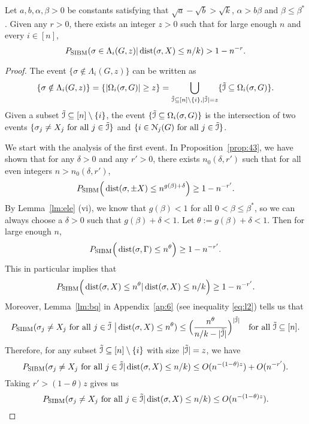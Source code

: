 \documentclass{article}
\begin{document}
\begin{lemma} \label{lm:us}
	Let $a,b,\alpha,\beta> 0$ be constants satisfying that $\sqrt{a}-\sqrt{b} > \sqrt{k}$, $\alpha>b\beta$ and $\beta\le \beta^\ast$.
	Given any $r>0$, there exists an integer $z>0$ such that for large enough $n$ and every $i\in[n]$, 
	\begin{equation} \label{eq:zr}
	P_{\operatorname{SIBM}} (\sigma\in \Lambda_i(G, z)
	| \operatorname{dist}(\sigma, X) \le n/k)
	> 1 - n^{-r} .
	\end{equation}
\end{lemma}
\begin{proof}
	The event $\{\sigma\notin \Lambda_i(G, z) \}$ can be written as
	\begin{equation} \label{eq:lei}
	\{\sigma\notin \Lambda_i(G, z) \}
	=\{|\Omega_i(\sigma,G)| \ge z \}
	=\bigcup_{\tilde{\mathcal{I}}\subseteq[n]\setminus\{i\}, |\tilde{\mathcal{I}}| = z} \{\tilde{\mathcal{I}} \subseteq \Omega_i(\sigma,G)\} .
	\end{equation}
	Given a subset $\tilde{\mathcal{I}}\subseteq[n]\setminus\{i\}$,
	the event $\{\tilde{\mathcal{I}} \subseteq \Omega_i(\sigma,G) \}$ is the intersection of two events $\{\sigma_j \neq X_j \text{~for all~} j\in \tilde{\mathcal{I}}\}$ and $\{i\in\mathcal{N}_j(G) \text{~for all~} j\in \tilde{\mathcal{I}}\}$.
	
	We start with the analysis of the first event.
	In Proposition~\ref{prop:43}, we have shown that
	for any $\delta>0$ and any $r'>0$, there exists $n_0(\delta, r')$ such that for all even integers $n>n_0(\delta, r')$,
	$$ 
	P_{\operatorname{SIBM}} \Big(\operatorname{dist}(\sigma,\pm X) \le n^{g(\beta)+\delta}
	\Big) \ge 1- n^{-r'} .
	$$
	By Lemma~\ref{lm:ele} (vi), we know that $g(\beta)<1$ for all $0<\beta\le\beta^\ast$, so we can always choose a $\delta>0$ such that $g(\beta)+\delta<1$.
	Let $\theta:=g(\beta)+\delta<1$. Then for large enough $n$,
	$$
	P_{\operatorname{SIBM}} \Big(\operatorname{dist}(\sigma, \Gamma) \le n^{\theta} \Big) \ge 1- n^{-r'} .
	$$
	This in particular implies that
	$$
	P_{\operatorname{SIBM}} \Big(\operatorname{dist}(\sigma, X) \le n^{\theta} | \operatorname{dist}(\sigma, X) \le n/k
	\Big) \ge 1- n^{-r'} .
	$$
	Moreover, Lemma~\ref{lm:bq} in Appendix~\ref{ap:6} (see inequality \eqref{eq:l2}) tells us that
	$$
	P_{\operatorname{SIBM}}(\sigma_j \neq X_j \text{~for all~}  j\in\tilde{\mathcal{I}}
	~\big| \operatorname{dist}(\sigma,X) \le n^\theta) \le \Big(\frac{n^\theta}{n/k-|\tilde{\mathcal{I}}|}
	\Big)^{|\tilde{\mathcal{I}}|}
	\quad \text{for all~} \tilde{\mathcal{I}}\subseteq [n] .
	$$
	Therefore, for any subset $\tilde{\mathcal{I}}\subseteq[n]\setminus\{i\}$ with size $|\tilde{\mathcal{I}}|=z$, we have
	$$
	P_{\operatorname{SIBM}}(\sigma_j \neq X_j \text{~for all~} j\in \tilde{\mathcal{I}}
	| \operatorname{dist}(\sigma, X) \le n/k )
	\le O(n^{-(1-\theta) z}) + O(n^{-r'}) . 
	$$
	Taking $r'>(1-\theta) z$ gives us
	\begin{equation} \label{eq:gr}
	P_{\operatorname{SIBM}}(\sigma_j \neq X_j \text{~for all~} j\in \tilde{\mathcal{I}}
	| \operatorname{dist}(\sigma, X) \le n/k )
	\le O(n^{-(1-\theta) z}) . 
	\end{equation}
	

\end{proof}
\end{document}

